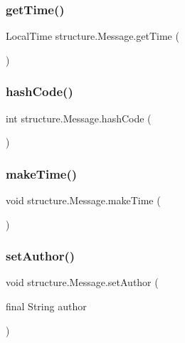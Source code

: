 \subsubsection{\texorpdfstring{get\+Time()}{getTime()}}
{\footnotesize\ttfamily Local\+Time structure.\+Message.\+get\+Time (\begin{DoxyParamCaption}{ }\end{DoxyParamCaption})}

\mbox{\label{classstructure_1_1_message_a9d0d32152bd93f3e3bf1f59a5b82b4ef}} 
\subsubsection{\texorpdfstring{hash\+Code()}{hashCode()}}
{\footnotesize\ttfamily int structure.\+Message.\+hash\+Code (\begin{DoxyParamCaption}{ }\end{DoxyParamCaption})}

\mbox{\label{classstructure_1_1_message_a4b7cc15e72f9c4c0cf98c06edea73529}} 
\subsubsection{\texorpdfstring{make\+Time()}{makeTime()}}
{\footnotesize\ttfamily void structure.\+Message.\+make\+Time (\begin{DoxyParamCaption}{ }\end{DoxyParamCaption})}

\mbox{\label{classstructure_1_1_message_a71321e51a130574d5c3e92b113d38a81}} 
\subsubsection{\texorpdfstring{set\+Author()}{setAuthor()}}
{\footnotesize\ttfamily void structure.\+Message.\+set\+Author (\begin{DoxyParamCaption}\item[{final String}]{author }\end{DoxyParamCaption})}

